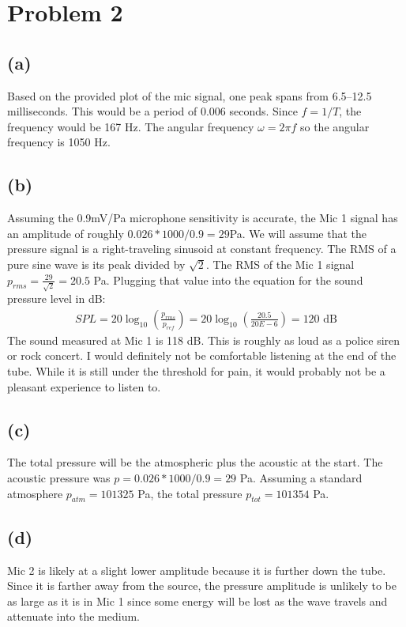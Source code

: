 \documentclass[12 pt]{article}
\begin{document}
\pagebreak
\section*{Problem 2}
\subsection*{(a)}
Based on the provided plot of the mic signal, one peak spans from 6.5--12.5 milliseconds. This would be a period of
0.006 seconds. Since $f=1/T$, the frequency would be 167 Hz. The angular frequency $\omega=2\pi f$ so the angular
frequency is 1050 Hz.

\subsection*{(b)}
Assuming the 0.9mV/Pa microphone sensitivity is accurate, the Mic 1 signal has an amplitude of roughly
$0.026*1000/0.9=29$Pa. We will assume that the pressure signal is a right-traveling sinusoid at constant frequency.
The RMS of a pure sine wave is its peak divided by $\sqrt{2}$. The RMS of the Mic 1 signal
$p_{rms}=\frac{29}{\sqrt{2}}=20.5$ Pa. Plugging that value into the equation for the sound pressure level in dB:
\begin{align*}
    SPL=20\log_{10}\left(\frac{p_{rms}}{p_{ref}}\right)=20\log_{10}\left(\frac{20.5}{20E-6}\right)=120\text{ dB}
\end{align*}
The sound measured at Mic 1 is 118 dB. This is roughly as loud as a police siren or rock concert. I would definitely not
be comfortable listening at the end of the tube. While it is still under the threshold for pain, it would probably not
be a pleasant experience to listen to.

\subsection*{(c)}
The total pressure will be the atmospheric plus the acoustic at the start. The acoustic pressure was $p=0.026*1000/0.9=29$
Pa. Assuming a standard atmosphere $p_{atm}=101325$ Pa, the total pressure $p_{tot}=101354$ Pa.

\subsection*{(d)}
Mic 2 is likely at a slight lower amplitude because it is further down the tube. Since it is farther away from the
source, the pressure amplitude is unlikely to be as large as it is in Mic 1 since some energy will be lost as the wave
travels and attenuate into the medium.
\end{document}

